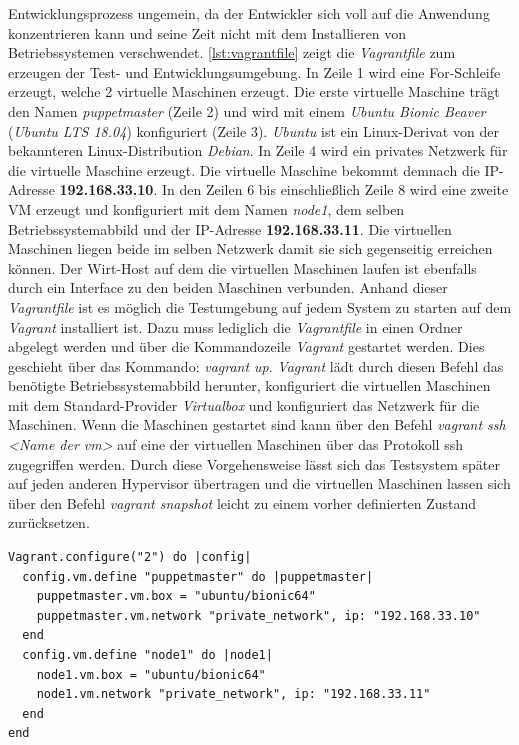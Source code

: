 \documentclass[titlepage]{report}
\begin{document}
Entwicklungsprozess ungemein, da der Entwickler sich voll auf die
Anwendung konzentrieren kann und seine Zeit nicht mit dem Installieren
von Betriebssystemen verschwendet. \autoref{lst:vagrantfile} zeigt
die \emph{Vagrantfile} zum erzeugen der Test\hyp{} und
Entwicklungsumgebung. In Zeile 1 wird eine For\hyp{}Schleife erzeugt,
welche 2 virtuelle Maschinen erzeugt. Die erste virtuelle Maschine trägt
den Namen \emph{puppetmaster} (Zeile 2) und wird mit einem \emph{Ubuntu
Bionic Beaver} (\emph{Ubuntu LTS 18.04}) konfiguriert (Zeile 3). \emph{Ubuntu} ist
ein Linux\hyp{}Derivat von der bekannteren Linux\hyp{}Distribution
\emph{Debian}. In Zeile 4 wird ein privates Netzwerk für die virtuelle
Maschine erzeugt. Die virtuelle Maschine bekommt demnach die
IP\hyp{}Adresse \textbf{192.168.33.10}. In den Zeilen 6 bis
einschließlich Zeile 8 wird eine zweite VM erzeugt und konfiguriert mit
dem Namen \emph{node1}, dem selben Betriebssystemabbild und der
IP\hyp{}Adresse \textbf{192.168.33.11}. Die virtuellen Maschinen liegen
beide im selben Netzwerk damit sie sich gegenseitig erreichen können.
Der Wirt\hyp{}Host auf dem die virtuellen Maschinen laufen ist ebenfalls
durch ein Interface zu den beiden Maschinen verbunden. Anhand dieser
\emph{Vagrantfile} ist es möglich die Testumgebung auf jedem System zu
starten auf dem \emph{Vagrant} installiert ist. Dazu muss lediglich die
\emph{Vagrantfile} in einen Ordner abgelegt werden und über die
Kommandozeile \emph{Vagrant} gestartet werden. Dies geschieht über das
Kommando: \emph{vagrant up}. \emph{Vagrant} lädt durch diesen Befehl das
benötigte Betriebssystemabbild herunter, konfiguriert die virtuellen
Maschinen mit dem Standard\hyp{}Provider \emph{Virtualbox} und
konfiguriert das Netzwerk für die Maschinen. Wenn die Maschinen
gestartet sind kann über den Befehl \emph{vagrant ssh <Name der vm>} auf
eine der virtuellen Maschinen über das Protokoll \gls{ssh} zugegriffen werden.
Durch diese Vorgehensweise lässt sich das Testsystem später auf jeden
anderen Hypervisor übertragen und die virtuellen Maschinen lassen sich
über den Befehl \emph{vagrant snapshot} leicht zu einem vorher
definierten Zustand zurücksetzen.
\begin{minipage}{\linewidth}
\begin{lstlisting}[caption={Vagrantfile der Test- und Entwicklungsumgebung},label={lst:vagrantfile}]
Vagrant.configure("2") do |config|
  config.vm.define "puppetmaster" do |puppetmaster|
    puppetmaster.vm.box = "ubuntu/bionic64"
    puppetmaster.vm.network "private_network", ip: "192.168.33.10"
  end
  config.vm.define "node1" do |node1|
    node1.vm.box = "ubuntu/bionic64"
    node1.vm.network "private_network", ip: "192.168.33.11"
  end
end
\end{lstlisting}
\end{minipage}
\end{document}
